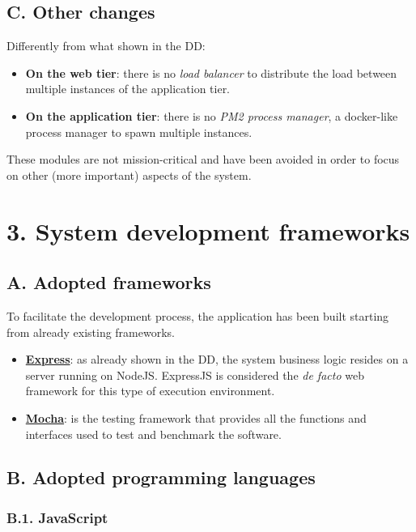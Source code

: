 \section{C. Other changes}

Differently from what shown in the DD:
\begin{itemize}
  \item \textbf{On the web tier}: there is no \emph{load balancer} to distribute the load between multiple instances of the application tier.
  \item \textbf{On the application tier}: there is no \emph{PM2 process manager}, a docker-like process manager to spawn multiple instances.
\end{itemize}
These modules are not mission-critical and have been avoided in order to focus on other (more important) aspects of the system.

\chapter{3. System development frameworks}

\section{A. Adopted frameworks}

To facilitate the development process, the application has been built starting from already existing frameworks.
\begin{itemize}
  \item \textbf{\href{https://www.npmjs.com/package/express}{Express}}: as already shown in the DD, the system business logic resides on a server running on NodeJS.
  ExpressJS is considered the \emph{de facto} web framework for this type of execution environment.
  \item \textbf{\href{https://www.npmjs.com/package/mocha}{Mocha}}: is the testing framework that provides all the functions and interfaces used to test and benchmark the software.
\end{itemize}

\section{B. Adopted programming languages}

\subsection{B.1. JavaScript}

